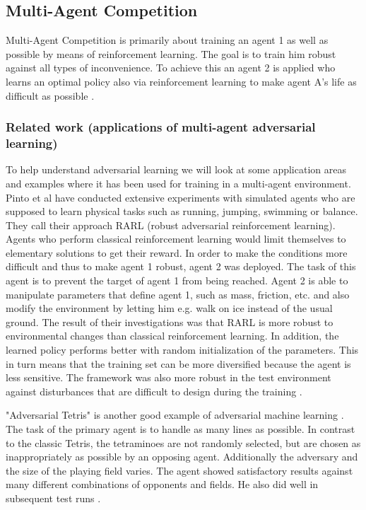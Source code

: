 \subsection{Multi-Agent Competition}

Multi-Agent Competition is primarily about training an agent 1 as well as possible by means of reinforcement learning. The goal is to train him robust against all types of inconvenience.
To achieve this an agent 2 is applied who learns an optimal policy also via reinforcement learning to make agent A's life as difficult as possible \cite{robustPinto2017Mar}.

\subsubsection{Related work (applications of multi-agent adversarial learning)}

To help understand adversarial learning we will look at some application areas and examples where it has been used for training in a multi-agent environment.\\

Pinto et al \cite{robustPinto2017Mar} have conducted extensive experiments with simulated agents who are supposed to learn physical tasks such as running, jumping, swimming or balance. They call their approach RARL (robust adversarial reinforcement learning). Agents who perform classical reinforcement learning would limit themselves to elementary solutions to get their reward. In order to make the conditions more difficult and thus to make agent 1 robust, agent 2 was deployed. The task of this agent is to prevent the target of agent 1 from being reached. Agent 2 is able to manipulate parameters that define agent 1, such as mass, friction, etc. and also modify the environment by letting him e.g. walk on ice instead of the usual ground.
The result of their investigations was that RARL is more robust to environmental changes than classical reinforcement learning. In addition, the learned policy performs better with random initialization of the parameters. This in turn means that the training set can be more diversified because the agent is less sensitive. The framework was also more robust in the test environment against disturbances that are difficult to design during the training \cite{robustPinto2017Mar}.

"Adversarial Tetris" is another good example of adversarial machine learning \cite{tetrisRovatsou2010May}. The task of the primary agent is to handle as many lines as possible. In contrast to the classic Tetris, the tetraminoes are not randomly selected, but are chosen as inappropriately as possible by an opposing agent. Additionally the adversary and the size of the playing field varies. 
The agent showed satisfactory results against many different combinations of opponents and fields. He also did well in subsequent test runs \cite{tetrisRovatsou2010May}.

